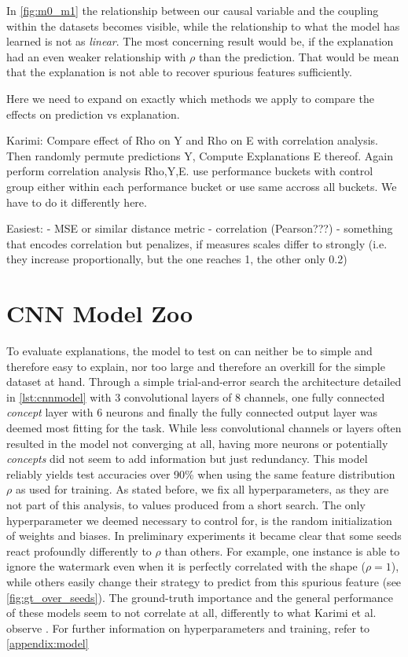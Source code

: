 In \cref{fig:m0_m1} the relationship between our causal variable and the coupling within the datasets becomes visible, while the relationship to what the model has learned is not as \textit{linear}. The most concerning result would be, if the explanation had an even weaker relationship with $\rho$ than the prediction. That would be mean that the explanation is not able to recover spurious features sufficiently. 

Here we need to expand on exactly which methods we apply to compare the effects on prediction vs explanation. 

Karimi: Compare effect of Rho on Y and Rho on E with correlation analysis. Then randomly permute predictions Y, Compute Explanations E thereof. Again perform correlation analysis Rho,Y,E. 
use performance buckets with control group either within each performance bucket or use same accross all buckets. 
We have to do it differently here.

Easiest: 
- MSE or similar distance metric
- correlation (Pearson???)
- something that encodes correlation but penalizes, if measures scales differ to strongly (i.e. they increase proportionally, but the one reaches 1, the other only 0.2)


\section{CNN Model Zoo}\label{section:training}
To evaluate explanations, the model to test on can neither be to simple and therefore easy to explain, nor too large and therefore an overkill for the simple dataset at hand.
Through a simple trial-and-error search the architecture detailed in \autoref{lst:cnnmodel} with 3 convolutional layers of 8 channels, one fully connected \textit{concept} layer with 6 neurons and finally the fully connected output layer was deemed most fitting for the task. While less convolutional channels or layers often resulted in the model not converging at all, having more neurons or potentially \textit{concepts} did not seem to add information but just redundancy.
This model reliably yields test accuracies over 90\% when using the same feature distribution $\rho$ as used for training. As stated before, we fix all hyperparameters, as they are not part of this analysis, to values produced from a short search.
The only hyperparameter we deemed necessary to control for, is the random initialization of weights and biases. In preliminary experiments it became clear that some seeds react profoundly differently to $\rho$ than others. For example, one instance is able to ignore the watermark even when it is perfectly correlated with the shape ($\rho = 1$), while others easily change their strategy to predict from this spurious feature (see \cref{fig:gt_over_seeds}). The ground-truth importance and the general performance of these models seem to not correlate at all, differently to what Karimi et al. observe \cite{Karimi2023}.
For further information on hyperparameters and training, refer to \cref{appendix:model}

